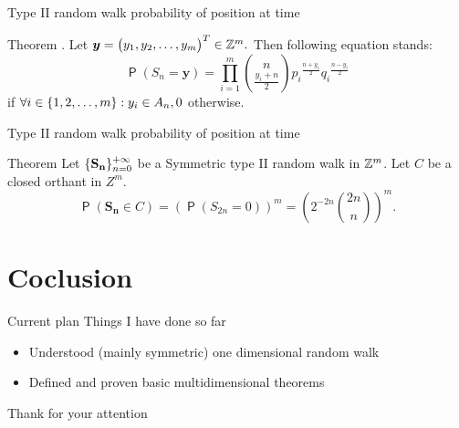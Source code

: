\documentclass{beamer}
\DeclareMathOperator{\pr}{\mathsf{P}}
\begin{document}
\begin{frame}{Type II random walk probability of position at time}
\begin{block}{Theorem}
  \Lrwm. Let $\boldsymbol{y}=\begin{pmatrix}
  y_1, y_2, \ldots, y_m
 \end{pmatrix}^T\in \mathbb{Z}^m.$ Then following equation stands:
 \[
 \pr \left( S_n=\boldsymbol{y} \right) =
 \prod_{i=1}^{m}\binom{n}{\frac{y_i+n}{2}}{p_i}^{\frac{n+y_i}{2}}{q_i}^{\frac{n-y_i}{2}}\]
 if $\forall i \in \{1,2,\ldots, m\}:y_i\in A_n, 0$ otherwise.

\end{block}
\end{frame}

\begin{frame}{Type II random walk probability of position at time}
\begin{block}{Theorem}
  Let $\{\mathbf{\mathbf{S_n}}\}_{n=0}^{+\infty}$ be a Symmetric type II random walk in $\mathbb{Z}^m$. Let $C$ be a closed orthant in $Z^m$.
  \[ \pr \left(\boldsymbol{S_n}\in C\right)=\left( \pr\left(S_{2n}=0\right)\right)^m=\left( 2^{-2n}\binom{2n}{n}\right)^m.\]

\end{block}
\end{frame}





\section{Coclusion}

\begin{frame}{Current plan}
Things I have done so far
\begin{itemize}
\item<1-> Understood (mainly symmetric) one dimensional random walk
\item<2-> Defined and proven basic multidimensional theorems
\end{itemize}

\medskip
{}

\end{frame}

\begin{frame}
   \Huge{\centerline{Thank for your attention}}
\end{frame}
\end{document}
